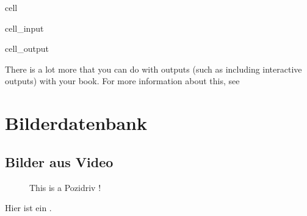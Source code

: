 \documentclass[letterpaper,10pt,english]{jupyterBook}
\let\sphinxpxdimen\pdfpxdimen\else\newdimen\sphinxpxdimen
\begin{document}
\begin{sphinxuseclass}{cell}
\begin{sphinxVerbatimInput}
\begin{sphinxuseclass}{cell_input}
\begin{sphinxVerbatim}[commandchars=\\\{\}]
    
  
 \PYG{p}{[}  \PYG{p}{]}
\end{sphinxVerbatim}

\end{sphinxuseclass}\end{sphinxVerbatimInput}
\begin{sphinxVerbatimOutput}

\begin{sphinxuseclass}{cell_output}
\noindent{}

\end{sphinxuseclass}\end{sphinxVerbatimOutput}

\end{sphinxuseclass}
\sphinxAtStartPar
There is a lot more that you can do with outputs (such as including interactive outputs)
with your book. For more information about this, see 


\part{Bilderdatenbank}


\chapter{Bilder aus Video}
\label{\detokenize{01_Bilderdatenbank/video2frames:bilder-aus-video}}\label{\detokenize{01_Bilderdatenbank/video2frames::doc}}
\begin{figure}[htbp]
\centering
\capstart

\noindent\sphinxincludegraphics[width=1000\sphinxpxdimen]{{pozi_quer}.PNG}
\caption{This is a Pozidriv !}\label{\detokenize{01_Bilderdatenbank/video2frames:markdown-fig}}\end{figure}

\sphinxAtStartPar
Hier ist ein .
\end{document}
